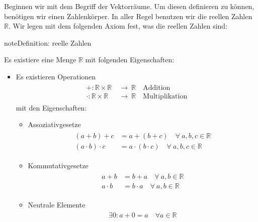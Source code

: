 \documentclass[letterpaper,10pt,english]{jupyterBook}
\begin{document}
Beginnen wir mit dem Begriff der Vektorräume. Um diesen definieren zu können, benötigen wir einen Zahlenkörper. In aller Regel benutzen wir die reellen Zahlen \(\mathbb{R}\). Wir legen mit dem folgenden Axiom fest, was die reellen Zahlen sind:

\begin{sphinxadmonition}{note}{Definition: reelle Zahlen}

Es existiere eine Menge \(\mathbb{R}\) mit folgenden Eigenschaften:
\begin{itemize}
\item {} 
Es existieren Operationen
\begin{equation*}
\begin{split}\begin{split}  + : \mathbb{R} \times \mathbb{R} \ & \to \ \mathbb{R}\quad\text{Addition}\\
  \cdot : \mathbb{R} \times \mathbb{R} \ & \to \ \mathbb{R}\quad\text{Multiplikation}\end{split}\end{split}
\end{equation*}
mit den Eigenschaften:
\begin{itemize}
\item {} 
Assoziativgesetze
\begin{equation*}
\begin{split}\begin{split}
    (a+b) + c & = a + (b+c)\quad \forall\ a,b,c \in \mathbb{R}\\
    (a\cdot b) \cdot c & = a \cdot (b\cdot c)\quad \forall\ a,b,c \in \mathbb{R}
    \end{split}\end{split}
\end{equation*}
\item {} 
Kommutativgesetze
\begin{equation*}
\begin{split}\begin{split}
    a + b & = b + a \quad \forall\ a,b \in \mathbb{R}\\
    a\cdot b & = b \cdot a\quad \forall\ a,b \in \mathbb{R}
    \end{split}\end{split}
\end{equation*}
\item {} 
Neutrale Elemente
\begin{equation*}
\begin{split}\begin{split}
    \exists 0: a + 0 = a\quad \forall a \in \mathbb{R}\\

\end{split}
\end{split}
\end{equation*}
\end{itemize}
\end{itemize}
\end{sphinxadmonition}
\end{document}
